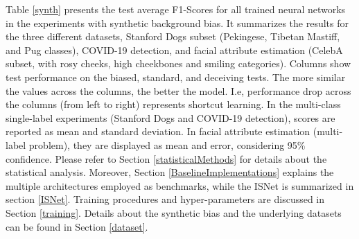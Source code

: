 \documentclass[fleqn,10pt]{wlscirep}
\begin{document}
{Table \ref{synth} presents the test average F1-Scores for all trained neural networks in the experiments with synthetic background bias. It summarizes the results for the three different datasets, Stanford Dogs subset (Pekingese, Tibetan Mastiff, and Pug classes), COVID-19 detection, and facial attribute estimation (CelebA subset\cite{celebA}, with rosy cheeks, high cheekbones and smiling categories). Columns show test performance on the biased, standard, and deceiving tests. The more similar the values across the columns, the better the model. I.e, performance drop across the columns (from left to right) represents shortcut learning. In the multi-class single-label experiments (Stanford Dogs and COVID-19 detection), scores are reported as mean and standard deviation. In facial attribute estimation (multi-label problem), they are displayed as mean and error, considering 95\% confidence. Please refer to Section \ref{statisticalMethods} for details about the statistical analysis. Moreover, Section \ref{BaselineImplementations} explains the multiple architectures employed as benchmarks, while the ISNet is summarized in section \ref{ISNet}. Training procedures and hyper-parameters are discussed in Section \ref{training}. Details about the synthetic bias and the underlying datasets can be found in Section \ref{dataset}.


}
\end{document}

